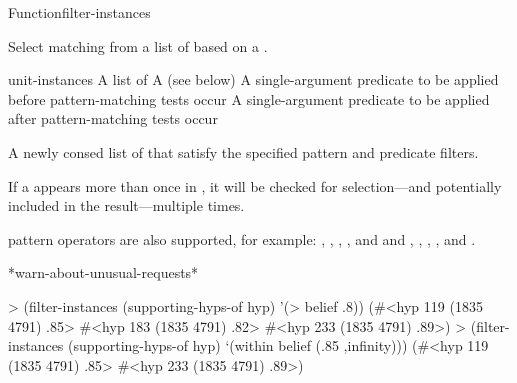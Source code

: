 \documentclass[10pt,twoside,english,pdftex]{article}
\begin{document}
\begin{functiondoc}{Function}{filter-instances}{   \returns{} 
      }
%
%
%

\fnsyntax

\fnpurpose Select matching  from a list of
 based on a .

\fnpackage {}

\fnmodule {}

\fnargs
\begin{args}{unit-instances}
 A list of 
\arg[pattern] A  (see below)
 A single-argument predicate to be applied before
pattern-matching tests occur
 A single-argument predicate to be
applied after pattern-matching tests occur
\end{args}

%
%
\fnreturns A newly consed list of  that satisfy
the specified pattern and predicate filters.

\fndsyntax
\patternspec

\fnterms
\patternterms

\fndescription If a  appears more than once in
, it will be checked for selection---and potentially
included in the result---multiple times.

 pattern operators are also
supported, for example: \code{=\&}, \code{=\$\&}, \code{=\$}, \code{=\$\$},
and \code{=\$\$\$} and , , ,
, and .

\begin{alsos}{*warn-about-unusual-requests*}
\end{alsos}

\fnexamples
\begin{example}
> (filter-instances (supporting-hyps-of hyp) '(> belief .8))
(#<hyp 119 (1835 4791) .85>
 #<hyp 183 (1835 4791) .82>
 #<hyp 233 (1835 4791) .89>)
> (filter-instances (supporting-hyps-of hyp) `(within belief (.85 ,infinity)))
(#<hyp 119 (1835 4791) .85>
 #<hyp 233 (1835 4791) .89>)
\end{example}

\end{functiondoc}
\end{document}
